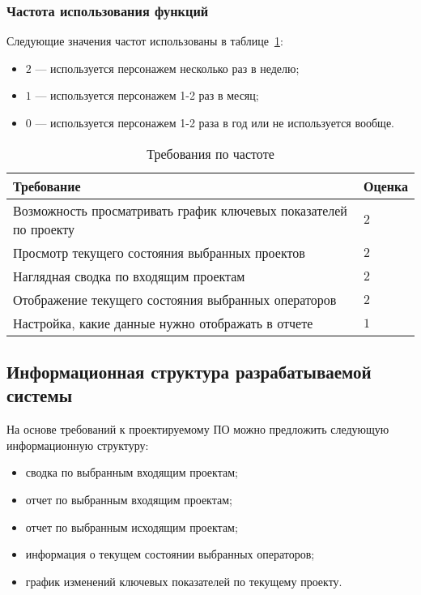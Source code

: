 \subsubsection{Частота использования функций}

Следующие значения частот использованы в таблице~\ref{tab:req:frequency}:
\begin{itemize}
    \item $2$ --- используется персонажем несколько раз в неделю;
    \item $1$ --- используется персонажем 1-2 раз в месяц;
    \item $0$ --- используется персонажем 1-2 раза в год или не используется вообще.
\end{itemize}

\begin{table}[ht]
    \caption{Требования по частоте}
    \begin{small}
        \begin{tabular}{|p{}|p{}|}
            \hline
            Требование                          & Оценка \\
            \hline
            Возможность просматривать график ключевых показателей по проекту & $2$  \\
            \hline
            Просмотр текущего состояния выбранных проектов          & $2$    \\
            \hline
            Наглядная сводка по входящим проектам               & $2$ \\
            \hline
            Отображение текущего состояния выбранных операторов              & $2$ \\
            \hline
            Настройка, какие данные нужно отображать в отчете              & $1$ \\
            \hline
        \end{tabular}
    \end{small}
    \label{tab:req:frequency}
\end{table}

\subsection{Информационная структура разрабатываемой системы}

На основе требований к проектируемому ПО можно предложить следующую информационную структуру:
\begin{itemize}
    \item сводка по выбранным входящим проектам;
    \item отчет по выбранным входящим проектам;
    \item отчет по выбранным исходящим проектам;
    \item информация о текущем состоянии выбранных операторов;
    \item график изменений ключевых показателей по текущему проекту.
\end{itemize}

